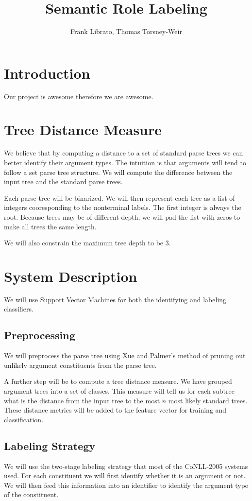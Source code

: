 \documentclass{article}
\author{Frank Librato, Thomas Torsney-Weir}
\title{Semantic Role Labeling}
\begin{document}
\maketitle

\section{Introduction}
Our project is awesome therefore we are awesome.

\section{Tree Distance Measure}
We believe that by computing a distance to a set of standard parse trees
we can better identify their argument types.  The intuition is that 
arguments will tend to follow a set parse tree structure.  We will 
compute the difference between the input tree and the standard parse trees.

Each parse tree will be binarized.  We will then represent each tree as a 
list of integers cooresponding to the nonterminal labels.  The first 
integer is always the root.  Because trees may be of different depth, we will
pad the list with zeros to make all trees the same length.

We will also constrain the maximum tree depth to be 3.

\section{System Description}
We will use Support Vector Machines for both the identifying and labeling
classifiers.

\subsection{Preprocessing}
We will preprocess the parse tree using Xue and Palmer's method of pruning
out unlikely argument constituents from the parse tree.

A further step will be to compute a tree distance measure.  We have grouped
argument trees into a set of classes.  This measure will tell us for each 
subtree what is the distance from the input tree to the most $n$ most likely
standard trees.  These distance metrics will be added to the feature vector
for training and classification.

\subsection{Labeling Strategy}
We will use the two-stage labeling strategy that most of the CoNLL-2005 
systems used.  For each constituent we will first identify whether it is
an argument or not.  We will then feed this information into an identifier
to identify the argument type of the constituent.
\end{document}
